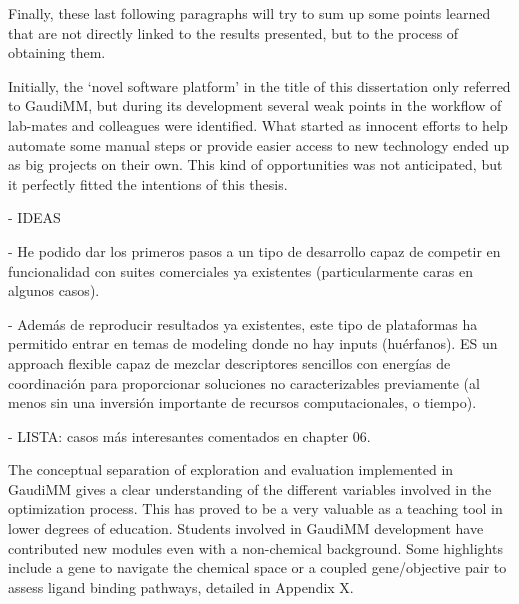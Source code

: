 
Finally, these last following paragraphs will try to sum up some points learned that are not directly linked to the results presented, but to the process of obtaining them.

Initially, the ‘novel software platform’ in the title of this dissertation only referred to GaudiMM, but during its development several weak points in the workflow of lab-mates and colleagues were identified. What started as innocent efforts to help automate some manual steps or provide easier access to new technology ended up as big projects on their own. This kind of opportunities was not anticipated, but it perfectly fitted the intentions of this thesis.

- IDEAS

	- He podido dar los primeros pasos a un tipo de desarrollo capaz de competir en funcionalidad con suites comerciales ya existentes (particularmente caras en algunos casos).

	- Además de reproducir resultados ya existentes, este tipo de plataformas ha permitido entrar en temas de modeling donde no hay inputs (huérfanos). ES un approach flexible capaz de mezclar descriptores sencillos con energías de coordinación para proporcionar soluciones no caracterizables previamente (al menos sin una inversión importante de recursos computacionales, o tiempo).

	- LISTA: casos más interesantes comentados en chapter 06.

	The conceptual separation of exploration and evaluation implemented in GaudiMM gives a clear understanding of the different variables involved in the optimization process. This has proved to be a very valuable as a teaching tool in lower degrees of education. Students involved in GaudiMM development have contributed new modules even with a non-chemical background. Some highlights include a gene to navigate the chemical space or a coupled gene/objective pair to assess ligand binding pathways, detailed in Appendix X.


